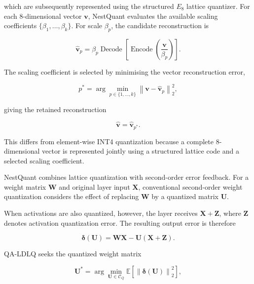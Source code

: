 which are subsequently represented using the structured \(E_8\)
lattice quantizer.
For each 8-dimensional vector \(\mathbf{v}\), NestQuant evaluates the
available scaling coefficients
\(\{\beta_1,\ldots,\beta_k\}\). For scale \(\beta_p\), the candidate
reconstruction is

\begin{equation}
\widehat{\mathbf{v}}_{p}
=
\beta_p
\operatorname{Decode}
\left[
\operatorname{Encode}
\left(
\frac{\mathbf{v}}{\beta_p}
\right)
\right].
\label{eq:nestquant-vector-reconstruction}
\end{equation}

The scaling coefficient is selected by minimising the vector
reconstruction error,

\begin{equation}
p^{*}
=
\arg\min_{p\in\{1,\ldots,k\}}
\left\|
\mathbf{v}
-
\widehat{\mathbf{v}}_{p}
\right\|_2^2 ,
\label{eq:nestquant-beta-selection}
\end{equation}

giving the retained reconstruction

\begin{equation}
\widehat{\mathbf{v}}
=
\widehat{\mathbf{v}}_{p^{*}} .
\label{eq:nestquant-vector-output}
\end{equation}

This differs from element-wise INT4 quantization because a complete
8-dimensional vector is represented jointly using a structured lattice
code and a selected scaling coefficient.

NestQuant combines lattice quantization with second-order error
feedback. For a weight matrix \(\mathbf{W}\) and original layer input
\(\mathbf{X}\), conventional second-order weight quantization considers
the effect of replacing \(\mathbf{W}\) by a quantized matrix
\(\mathbf{U}\).

When activations are also quantized, however, the layer receives
\(\mathbf{X}+\mathbf{Z}\), where \(\mathbf{Z}\) denotes activation
quantization error. The resulting output error is therefore

\begin{equation}
\boldsymbol{\delta}(\mathbf{U})
=
\mathbf{W}\mathbf{X}
-
\mathbf{U}
\left(
\mathbf{X}+\mathbf{Z}
\right).
\label{eq:nestquant-output-error}
\end{equation}

QA-LDLQ seeks the quantized weight matrix

\begin{equation}
\mathbf{U}^{*}
=
\arg\min_{\mathbf{U}\in\mathcal{C}_{Q}}
\mathbb{E}
\left[
\left\|
\boldsymbol{\delta}(\mathbf{U})
\right\|_2^2
\right],
\label{eq:qa-ldlq-objective}
\end{equation}

